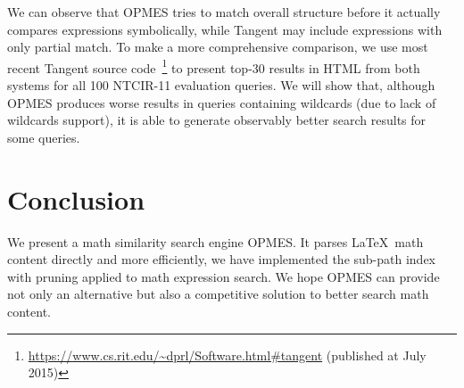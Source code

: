 \documentclass{llncs}
\begin{document}
We can observe that OPMES tries to match overall structure before it actually compares expressions symbolically, while Tangent may include expressions with only partial match.
To make a more comprehensive comparison, we use most recent Tangent source code~\footnote{\url{https://www.cs.rit.edu/~dprl/Software.html#tangent} (published at July 2015)} 
to present top-30 results in HTML from both systems for all 100 NTCIR-11 evaluation queries. 
We will show that, although OPMES produces worse results in queries containing wildcards (due to lack of wildcards support), 
it is able to generate observably better search results for some queries.

\section{Conclusion}
We present a math similarity search engine OPMES. It parses \LaTeX\ math content directly and more efficiently, 
we have implemented the sub-path index with pruning applied to math expression search. 
We hope OPMES can provide not only an alternative but also a competitive solution to better search math content. 



\end{document}
